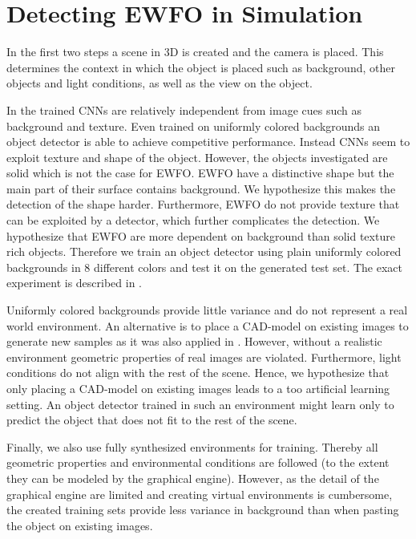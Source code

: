 	\chapter{Detecting \ac{EWFO} in Simulation}
	\label{sec:object_detection}
	
	In the first two steps a scene in 3D is created and the camera is placed. This determines the context in which the object is placed such as background, other objects and light conditions, as well as the view on the object.
	
	In \cite{Peng} the trained \acp{CNN} are relatively independent from image cues such as background and texture. Even trained on uniformly colored backgrounds an object detector is able to achieve competitive performance. Instead \acp{CNN} seem to exploit texture and shape of the object. However, the objects investigated are solid which is not the case for \ac{EWFO}. \ac{EWFO} have a distinctive shape but the main part of their surface contains background. We hypothesize this makes the detection of the shape harder. Furthermore, \ac{EWFO} do not provide texture that can be exploited by a detector, which further complicates the detection. We hypothesize that \ac{EWFO} are more dependent on background than solid texture rich objects. Therefore we train an object detector using plain uniformly colored backgrounds in 8 different colors and test it on the generated test set. The exact experiment is described in .
	
	Uniformly colored backgrounds provide little variance and do not represent a real world environment. An alternative is to place a \ac{CAD}-model on existing images to generate new samples as it was also applied in \cite{Madaan2017, Peng}.  However, without a realistic environment geometric properties of real images are violated. Furthermore, light conditions do not align with the rest of the scene. Hence, we hypothesize that only placing a \ac{CAD}-model on existing images leads to a too artificial learning setting. An object detector trained in such an environment might learn only to predict the object that does not fit to the rest of the scene.
	
	Finally, we also use fully synthesized environments for training. Thereby all geometric properties and environmental conditions are followed (to the extent they can be modeled by the graphical engine). However, as the detail of the graphical engine are limited and creating virtual environments is cumbersome, the created training sets provide less variance in background than when pasting the object on existing images.
	
